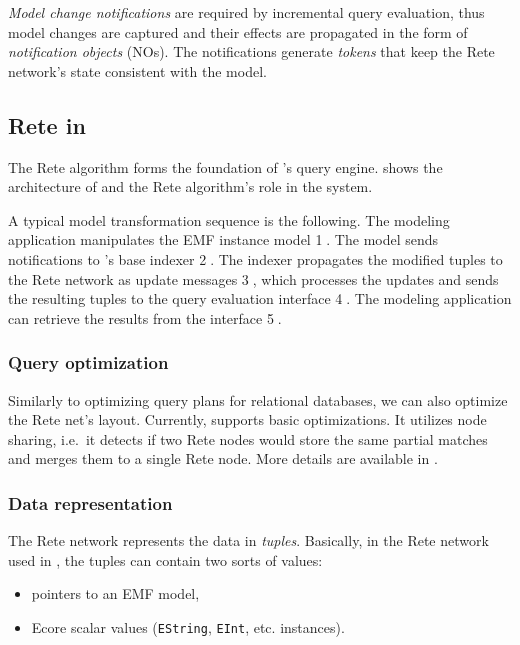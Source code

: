 \emph{Model change notifications} are required by incremental query evaluation, thus model changes are captured and their effects are propagated in the form of \emph{notification objects} (NOs). The notifications generate \emph{tokens} that keep the Rete network's state consistent with the model. 


\subsection{Rete in \eiq{}}

The Rete algorithm forms the foundation of \eiq{}'s query engine.  shows the architecture of \eiq{} and the Rete algorithm's role in the system. 

A typical model transformation sequence is the following. The modeling application manipulates the EMF instance model \textcircled{1}. The model sends notifications to \eiq{}'s base indexer \textcircled{2}. The indexer propagates the modified tuples to the Rete network as update messages \textcircled{3}, which processes the updates and sends the resulting tuples to the query evaluation interface \textcircled{4}. The modeling application can retrieve the results from the interface \textcircled{5}.


\subsubsection{Query optimization}

Similarly to optimizing query plans for relational databases, we can also optimize the Rete net's layout. Currently, \eiq{} supports basic optimizations. It utilizes node sharing, i.e.\ it detects if two Rete nodes would store the same partial matches and merges them to a single Rete node. More details are available in \cite{BergmannPhD}.

\subsubsection{Data representation}

The Rete network represents the data in \emph{tuples}. Basically, in the Rete network used in \eiq{}, the tuples can contain two sorts of values:
\begin{itemize}
  \item pointers to an EMF model,
  \item Ecore scalar values (\verb+EString+, \verb+EInt+, etc. instances).
\end{itemize}

